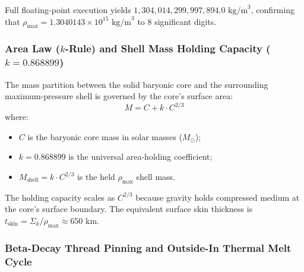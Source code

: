 \documentclass[11pt,a4paper]{article}
\begin{document}
Full floating-point execution yields $1,304,014,299,997,894.0\text{ kg/m}^3$, confirming that $\rho_{\max} = 1.3040143 \times 10^{15}\text{ kg/m}^3$ to 8 significant digits.

\subsubsection{Area Law ($k$-Rule) and Shell Mass Holding Capacity ($k = 0.868899$)}
\label{subsubsec:k_rule_area}

The mass partition between the solid baryonic core and the surrounding maximum-pressure shell is governed by the core's surface area:
\begin{equation}
M = C + k \cdot C^{2/3}
\label{eq:k_rule_formula}
\end{equation}
where:
\begin{itemize}
    \item $C$ is the baryonic core mass in solar masses ($M_\odot$);
    \item $k = 0.868899$ is the universal area-holding coefficient;
    \item $M_{\text{shell}} = k \cdot C^{2/3}$ is the held $\rho_{\max}$ shell mass.
\end{itemize}

The holding capacity scales as $C^{2/3}$ because gravity holds compressed medium at the core's surface boundary. The equivalent surface skin thickness is $t_{\text{skin}} = \Sigma_k / \rho_{\max} \approx 650\text{ km}$.

\subsubsection{Beta-Decay Thread Pinning and Outside-In Thermal Melt Cycle}
\label{subsubsec:melt_cycle}
\end{document}
